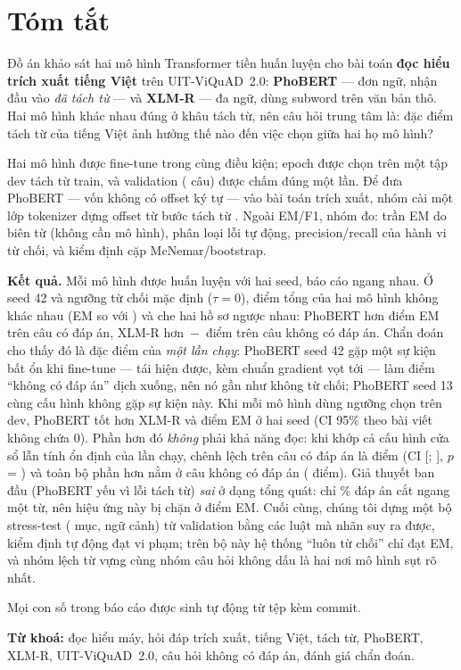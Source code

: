 \section*{Tóm tắt}

Đồ án khảo sát hai mô hình Transformer tiền huấn luyện cho bài toán \textbf{đọc hiểu trích xuất tiếng
Việt} trên UIT-ViQuAD~2.0: \textbf{PhoBERT} --- đơn ngữ, nhận đầu vào \emph{đã tách từ} --- và
\textbf{XLM-R} --- đa ngữ, dùng subword trên văn bản thô. Hai mô hình khác nhau đúng ở khâu tách từ, nên
câu hỏi trung tâm là: đặc điểm tách từ của tiếng Việt ảnh hưởng thế nào đến việc chọn giữa hai họ mô hình?

Hai mô hình được fine-tune trong cùng điều kiện; epoch được chọn trên một tập dev tách từ train, và
validation (\NVal{} câu) được chấm đúng một lần. Để đưa PhoBERT --- vốn không có offset ký tự --- vào bài toán
trích xuất, nhóm cài một lớp tokenizer dựng offset từ bước tách từ . Ngoài EM/F1, nhóm đo: trần
EM do biên từ (không cần mô hình), phân loại lỗi tự động, precision/recall của hành vi từ chối, và kiểm định
cặp McNemar/bootstrap.

\textbf{Kết quả.} Mỗi mô hình được huấn luyện với hai seed, báo cáo ngang nhau. Ở seed 42 và ngưỡng từ chối
mặc định ($\tau = 0$), điểm tổng của hai mô hình không khác nhau (EM \PhobertEM{} so với \XlmrEM) và che hai hồ
sơ ngược nhau: PhoBERT hơn \PairAnsDiff{} điểm EM trên câu có đáp án, XLM-R hơn \,$-$\PairImpDiff{}\, điểm trên câu
không có đáp án. Chẩn đoán cho thấy đó là đặc điểm của \emph{một lần chạy}: PhoBERT seed 42 gặp một sự kiện bất
ổn khi fine-tune --- tái hiện được, kèm chuẩn gradient vọt tới \ResumeHighMaxSpike{} --- làm điểm ``không có đáp án''
dịch xuống, nên nó gần như không từ chối; PhoBERT seed 13 cùng cấu hình không gặp sự kiện này. Khi mỗi mô hình
dùng ngưỡng chọn trên dev, PhoBERT tốt hơn XLM-R \PairTDiff{} và \PairSTDiff{} điểm EM ở hai seed (CI 95\% theo
bài viết không chứa 0). Phần hơn đó \emph{không} phải khả năng đọc: khi khớp cả cấu hình cửa sổ lẫn tính ổn định
của lần chạy, chênh lệch trên câu có đáp án là \PairMAnsDiff{} điểm (CI [\PairMAnsArtLo; \PairMAnsArtHi],
$p$ = \PairMAnsP) và toàn bộ phần hơn nằm ở câu không có đáp án (\PairMImpDiff{} điểm). Giả thuyết ban đầu
(PhoBERT yếu vì lỗi tách từ) \emph{sai} ở dạng tổng quát: chỉ \SegMisPct\% đáp án cắt ngang một từ, nên hiệu ứng
này bị chặn ở \SegCeilingLoss{} điểm EM. Cuối cùng, chúng tôi dựng một bộ stress-test (\StressN{} mục,
\StressCtx{} ngữ cảnh) từ validation bằng các luật mà nhãn suy ra được, kiểm định tự động đạt \StressViol{}
vi phạm; trên bộ này hệ thống ``luôn từ chối'' chỉ đạt \AbstainStressEM{} EM, và nhóm lệch từ vựng cùng
nhóm câu hỏi không dấu là hai nơi mô hình sụt rõ nhất.

Mọi con số trong báo cáo được sinh tự động từ tệp  kèm commit.

\vspace{0.6em}
\noindent\textbf{Từ khoá:} đọc hiểu máy, hỏi đáp trích xuất, tiếng Việt, tách từ, PhoBERT, XLM-R,
UIT-ViQuAD~2.0, câu hỏi không có đáp án, đánh giá chẩn đoán.
